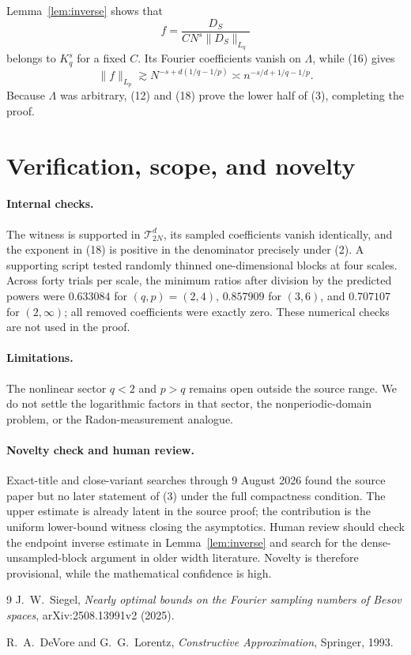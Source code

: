 \documentclass[11pt]{article}
\newcommand{\cT}{\mathcal T}
\begin{document}
Lemma~\ref{lem:inverse} shows that
\[
             f=\frac{D_S}{C N^s\|D_S\|_{L_q}}                  \tag{17}
\]
belongs to \(K_q^s\) for a fixed \(C\).  Its Fourier coefficients vanish
on \(\Lambda\), while (16) gives
\[
 \|f\|_{L_p}
 \gtrsim N^{-s+d(1/q-1/p)}
 \asymp n^{-s/d+1/q-1/p}.                                      \tag{18}
\]
Because \(\Lambda\) was arbitrary, (12) and (18) prove the lower half
of (3), completing the proof.

\section{Verification, scope, and novelty}

\paragraph{Internal checks.}
The witness is supported in \(\cT_{2N}^d\), its sampled coefficients
vanish identically, and the exponent in (18) is positive in the denominator
precisely under (2).  A supporting script tested randomly thinned
one-dimensional blocks at four scales.  Across forty trials per scale, the
minimum ratios after division by the predicted powers were \(0.633084\) for
\((q,p)=(2,4)\), \(0.857909\) for \((3,6)\), and \(0.707107\) for
\((2,\infty)\); all removed coefficients were exactly zero.  These numerical
checks are not used in the proof.

\paragraph{Limitations.}
The nonlinear sector \(q<2\) and \(p>q\) remains open outside the source
range.  We do not settle the logarithmic factors in that sector, the
nonperiodic-domain problem, or the Radon-measurement analogue.

\paragraph{Novelty check and human review.}
Exact-title and close-variant searches through 9 August 2026 found the source
paper but no later statement of (3) under the full compactness condition.
The upper estimate is already latent in the source proof; the contribution is
the uniform lower-bound witness closing the asymptotics.  Human review should
check the endpoint inverse estimate in Lemma~\ref{lem:inverse} and search for
the dense-unsampled-block argument in older width literature.  Novelty is
therefore provisional, while the mathematical confidence is high.

\begin{thebibliography}{9}
J.~W.~Siegel,
\emph{Nearly optimal bounds on the Fourier sampling numbers of Besov spaces},
arXiv:2508.13991v2 (2025).

R.~A.~DeVore and G.~G.~Lorentz,
\emph{Constructive Approximation},
Springer, 1993.
\end{thebibliography}
\end{document}
